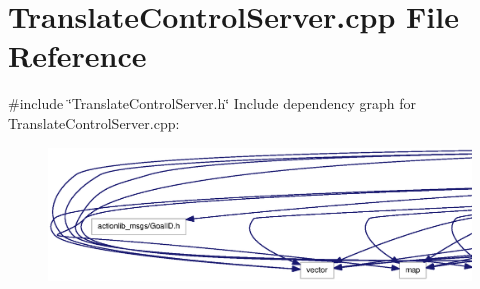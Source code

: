 \section{\-Translate\-Control\-Server.\-cpp \-File \-Reference}
\label{TranslateControlServer_8cpp}
{\ttfamily \#include \char`\"{}\-Translate\-Control\-Server.\-h\char`\"{}}\*
\-Include dependency graph for \-Translate\-Control\-Server.\-cpp\-:
\nopagebreak
\begin{figure}[H]
\begin{center}
\leavevmode
\includegraphics[width=350pt]{TranslateControlServer_8cpp__incl}
\end{center}
\end{figure}

